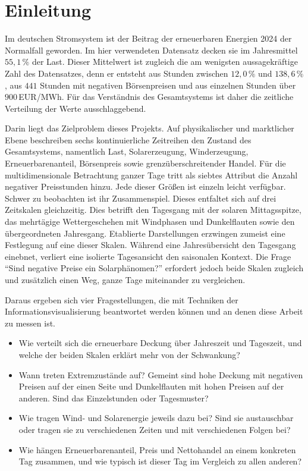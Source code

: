 \section{Einleitung}

Im deutschen Stromsystem ist der Beitrag der erneuerbaren Energien 2024 der Normalfall geworden.
Im hier verwendeten Datensatz decken sie im Jahresmittel $55{,}1\,\%$ der Last. Dieser Mittelwert
ist zugleich die am wenigsten aussagekräftige Zahl des Datensatzes, denn er entsteht aus Stunden
zwischen $12{,}0\,\%$ und $138{,}6\,\%$, aus $441$ Stunden mit negativen Börsenpreisen und aus
einzelnen Stunden über $900$\,EUR/MWh. Für das Verständnis des Gesamtsystems ist daher die zeitliche
Verteilung der Werte ausschlaggebend.

Darin liegt das Zielproblem dieses Projekts. Auf physikalischer und marktlicher Ebene beschreiben sechs kontinuierliche Zeitreihen den Zustand des Gesamtsystems, namentlich Last, Solarerzeugung, Winderzeugung, Erneuerbarenanteil, Börsenpreis sowie grenzüberschreitender Handel. Für die multidimensionale Betrachtung ganzer Tage tritt als siebtes Attribut die Anzahl negativer Preisstunden hinzu. Jede dieser Größen ist einzeln leicht verfügbar. Schwer zu beobachten ist ihr Zusammenspiel. Dieses entfaltet sich auf drei Zeitskalen gleichzeitig. Dies betrifft den Tagesgang
mit der solaren Mittagsspitze, das mehrtägige Wettergeschehen mit Windphasen und Dunkelflauten sowie
den übergeordneten Jahresgang. Etablierte Darstellungen erzwingen zumeist eine Festlegung auf eine
dieser Skalen. Während eine Jahresübersicht den Tagesgang einebnet, verliert eine isolierte Tagesansicht
den saisonalen Kontext. Die Frage \enquote{Sind negative Preise ein Solarphänomen?} erfordert jedoch beide
Skalen zugleich und zusätzlich einen Weg, ganze Tage miteinander zu vergleichen.

Daraus ergeben sich vier Fragestellungen, die mit Techniken der Informationsvisualisierung
beantwortet werden können und an denen diese Arbeit zu messen ist.

\begin{itemize}
  \item[\textbf{F1}] Wie verteilt sich die erneuerbare Deckung über Jahreszeit und Tageszeit, und
        welche der beiden Skalen erklärt mehr von der Schwankung?
  \item[\textbf{F2}] Wann treten Extremzustände auf? Gemeint sind hohe Deckung mit negativen
        Preisen auf der einen Seite und Dunkelflauten mit hohen Preisen auf der anderen. Sind das
        Einzelstunden oder Tagesmuster?
  \item[\textbf{F3}] Wie tragen Wind- und Solarenergie jeweils dazu bei? Sind sie austauschbar oder
        tragen sie zu verschiedenen Zeiten und mit verschiedenen Folgen bei?
  \item[\textbf{F4}] Wie hängen Erneuerbarenanteil, Preis und Nettohandel an einem konkreten Tag
        zusammen, und wie typisch ist dieser Tag im Vergleich zu allen anderen?
\end{itemize}

